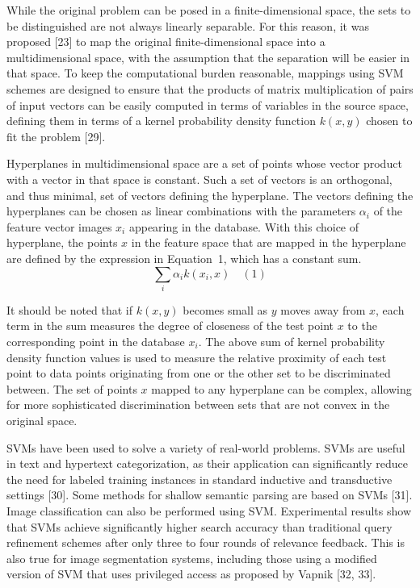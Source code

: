 \documentclass[preprint,12pt]{elsarticle}
\begin{document}
While the original problem can be posed in a finite-dimensional space, the sets to be distinguished are not always linearly separable. For this reason, it was proposed [23] to map the original finite-dimensional space into a multidimensional space, with the assumption that the separation will be easier in that space. To keep the computational burden reasonable, mappings using SVM schemes are designed to ensure that the products of matrix multiplication of pairs of input vectors can be easily computed in terms of variables in the source space, defining them in terms of a kernel probability density function $k(x, y)$ chosen to fit the problem [29].

Hyperplanes in multidimensional space are a set of points whose vector product with a vector in that space is constant. Such a set of vectors is an orthogonal, and thus minimal, set of vectors defining the hyperplane. The vectors defining the hyperplanes can be chosen as linear combinations with the parameters $\alpha_{i}$ of the feature vector images $x_{i}$ appearing in the database. With this choice of hyperplane, the points $x$ in the feature space that are mapped in the hyperplane are defined by the expression 
in Equation~1, which has a constant sum.
\begin{equation}
	\sum_{i} \alpha_{i}k(x_{i},x)
	\quad\left(1\right)
\end{equation}

It should be noted that if $k(x, y)$ becomes small as $y$ moves away from $x$, each term in the sum measures the degree of closeness of the test point $x$ to the corresponding point in the database $x_{i}$. The above sum of kernel probability density function values is used to measure the relative proximity of each test point to data points originating from one or the other set to be discriminated between. The set of points $x$ mapped to any hyperplane can be complex, allowing for more sophisticated discrimination between sets that are not convex in the original space.

SVMs have been used to solve a variety of real-world problems. SVMs are useful in text and hypertext categorization, as their application can significantly reduce the need for labeled training instances in standard inductive and transductive settings [30]. Some methods for shallow semantic parsing are based on SVMs [31]. Image classification can also be performed using SVM. Experimental results show that SVMs achieve significantly higher search accuracy than traditional query refinement schemes after only three to four rounds of relevance feedback. This is also true for image segmentation systems, including those using a modified version of SVM that uses privileged access as proposed by Vapnik [32, 33].
\end{document}
